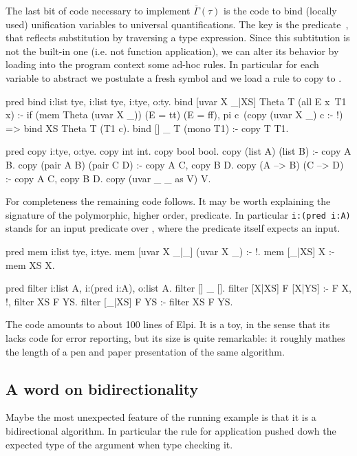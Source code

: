 \documentclass[a4paper, 11pt]{book}
\begin{document}
The last bit of code necessary to implement $\overline{\Gamma}(\tau)$ is
the code to bind (locally used) unification variables to universal quantifications.
The key is the  predicate~\cite{}, that reflects substitution
by traversing a type expression. Since this subtitution is not the built-in
one (i.e. not function application), we can alter its behavior by loading
into the program context some ad-hoc rules. In particular for
each variable  to abstract we postulate a fresh symbol
 and we load a rule to copy  to .

\begin{elpicode}
pred bind i:list tye, i:list tye, i:tye, o:ty.
bind [uvar X _|XS] Theta T (all E x\ T1 x) :- %
  if (mem Theta (uvar X _)) (E = tt) (E = ff),
  pi c\ (copy (uvar X _) c :- !) => bind XS Theta T (T1 c).
bind [] _ T (mono T1) :- copy T T1. %

pred copy i:tye, o:tye.
copy int int.
copy bool bool.
copy (list A) (list B) :- copy A B.
copy (pair A B) (pair C D) :- copy A C, copy B D.
copy (A --> B) (C --> D) :- copy A C, copy B D.
copy (uvar _ _ as V) V.
\end{elpicode}

For completeness the remaining code follows. It may be worth explaining the
signature of the polymorphic, higher order,  predicate.
In particular \texttt{i:(pred i:A)} stands for an input predicate over
, where the predicate itself expects an input.

\begin{elpicode}
pred mem i:list tye, i:tye.
mem [uvar X _|_] (uvar X _) :- !.
mem [_|XS] X :- mem XS X.
 
pred filter i:list A, i:(pred i:A), o:list A.
filter [] _ [].
filter [X|XS] F [X|YS] :- F X, !, filter XS F YS.
filter [_|XS] F YS :- filter XS F YS.
\end{elpicode}

The code amounts to about 100 lines of Elpi. It is a toy, in the sense
that its lacks code for error reporting, but its size is quite remarkable:
it roughly mathes the length of a pen and paper presentation of the same
algorithm.

\subsection{A word on bidirectionality}

Maybe the most unexpected feature of the running example is that
it is a bidirectional algorithm. In particular the rule for application
pushed dowh the expected type of the argument when type checking it.
\end{document}
